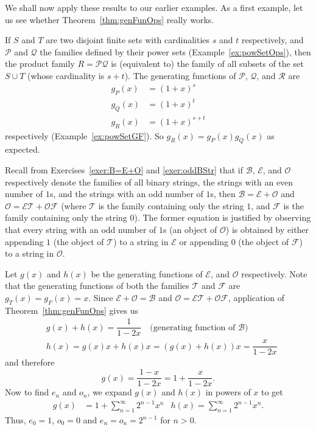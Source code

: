 \documentclass[11pt,a5paper]{amsart}
\newcommand{\cat}{\mathcal}
\begin{document}
We shall now apply these results to our earlier examples. As a first example, let us see whether Theorem~\ref{thm:genFunOps} really works. 
\begin{Example}
If $S$ and $T$ are two disjoint finite sets with cardinalities $s$ and $t$ respectively, and $\cat P$ and $\cat Q$ the families defined by their power sets (Example~\ref{ex:powSetOps}), then the product family $R = \cat P \cat Q$ is (equivalent to) the family of all subsets of the set $S \cup T$ (whose cardinality is $s + t$). The generating functions of $\cat P$, $\cat Q$, and $\cat R$ are
\begin{align*}
g_P(x) & = (1 + x)^s\\
g_Q(x) & = (1 + x)^t\\
g_R(x) & = (1 + x)^{s + t}
\end{align*}
respectively (Example~\ref{ex:powSetGF}). So $g_R(x) = g_P(x) g_Q(x)$ as expected.
\end{Example}
Recall from Exercises~\ref{exer:B=E+O} and \ref{exer:oddBStr} that if $\cat B$, $\cat E$, and $\cat O$ respectively denote the families of all binary strings, the strings with an even number of $1$s, and the strings with an odd number of $1$s, then $\cat B = \cat E + \cat O$ and $\cat O = \cat E \cat T + \cat O \cat F$ (where $\cat T$ is the family containing only the string $1$, and $\cat F$ is the family containing only the string $0$). The former equation is justified by observing that every string with an odd number of $1$s (an object of $\cat O$) is obtained by either appending $1$ (the object of $\cat T$) to a string in $\cat E$ or appending $0$ (the object of $\cat F$) to a string in $\cat O$.
\begin{Example}
Let $g(x)$ and $h(x)$ be the generating functions of $\cat E$, and $\cat O$ respectively. Note that the generating functions of both the families $\cat T$ and $\cat F$ are $g_T(x) = g_F(x) = x$. Since $\cat E + \cat O = \cat B$ and $\cat O = \cat E \cat T + \cat O \cat F$, application of Theorem~\ref{thm:genFunOps} gives us
\begin{align*}
& g(x) + h(x) = \dfrac 1 {1 - 2x}\quad \text{(generating function of $\cat B$)}\\
& h(x) = g(x) x + h(x) x = (g(x) + h(x))x = \dfrac x {1 - 2x}
\end{align*}
and therefore
\begin{equation*}
g(x) = \frac{1 - x}{1 - 2x} = 1 + \frac x {1 - 2x}.
\end{equation*}
Now to find $e_n$ and $o_n$, we expand $g(x)$ and $h(x)$ in powers of $x$ to get
\begin{align*}
g(x) & = 1 + \sum_{n = 1}^{\infty} 2^{n - 1} x^n & h(x) = \sum_{n = 1}^\infty 2^{n - 1} x^n.
\end{align*}
Thus, $e_0 = 1$, $o_0 = 0$ and $e_n = o_n = 2^{n - 1}$ for $n > 0$.
\end{Example}
\end{document}
